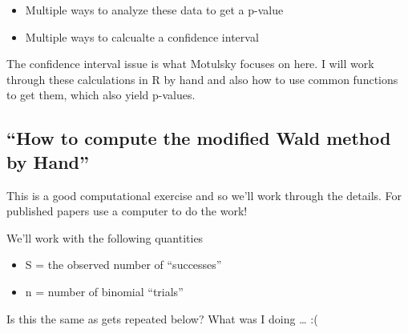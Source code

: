 \documentclass[]{book}
\providecommand{\tightlist}{%
  \setlength{\itemsep}{0pt}\setlength{\parskip}{0pt}}
\theoremstyle{definition}
\theoremstyle{definition}
\theoremstyle{definition}
\theoremstyle{remark}
\begin{document}
\begin{itemize}
\tightlist
\item
  Multiple ways to analyze these data to get a p-value
\item
  Multiple ways to calcualte a confidence interval
\end{itemize}

The confidence interval issue is what Motulsky focuses on here. I will
work through these calculations in R by hand and also how to use common
functions to get them, which also yield p-values.

\subsection{\texorpdfstring{``How to compute the modified Wald method by
Hand''}{How to compute the modified Wald method by Hand}}\label{how-to-compute-the-modified-wald-method-by-hand}

This is a good computational exercise and so we'll work through the
details. For published papers use a computer to do the work!

We'll work with the following quantities

\begin{itemize}
\tightlist
\item
  S = the observed number of ``successes''
\item
  n = number of binomial ``trials''
\end{itemize}

Is this the same as gets repeated below? What was I doing \ldots{} :(
\end{document}
